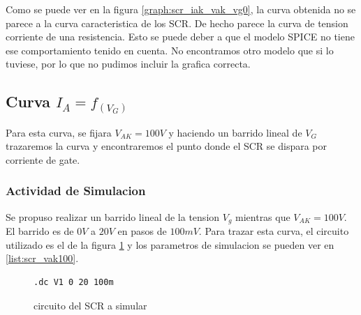           Como se puede ver en la figura \ref{graph:scr_iak_vak_vg0}, la curva obtenida no se parece a la curva
          caracteristica de los SCR. De hecho parece la curva de tension corriente de una resistencia. Esto se puede
          deber a que el modelo SPICE no tiene ese comportamiento tenido en cuenta. No encontramos otro modelo que si lo
          tuviese, por lo que no pudimos incluir la grafica correcta.

    \subsection{Curva $I_A = f_{(V_G)}$}
      Para esta curva, se fijara $V_{AK} = 100V$ y haciendo un barrido lineal de $V_G$ trazaremos la curva y
      encontraremos el punto donde el SCR se dispara por corriente de gate.

      \subsubsection{Actividad de Simulacion}
        Se propuso realizar un barrido lineal de la tension $V_g$ mientras que $V_{AK} = 100V$. El barrido es de $0V$ a
        $20V$ en pasos de $100mV$. Para trazar esta curva, el circuito utilizado es el de la figura \ref{crkt:scr_vak100}
        y los parametros de simulacion se pueden ver en \ref{list:scr_vak100}.
        \begin{figure}[!ht]
          \centering
          \begin{minipage}{0.45\textwidth}
            \centering
            
            \caption{circuito del SCR a simular}
            \label{crkt:scr_vak100}
          \end{minipage}
          \hfill
          \begin{minipage}{0.45\textwidth}
            \centering
          \begin{lstlisting}[style=ltspice, caption={Parámetros de simulación LTspice}, label=list:scr_vak100]
.dc V1 0 20 100m
          \end{lstlisting}
          \end{minipage}
        \end{figure}

